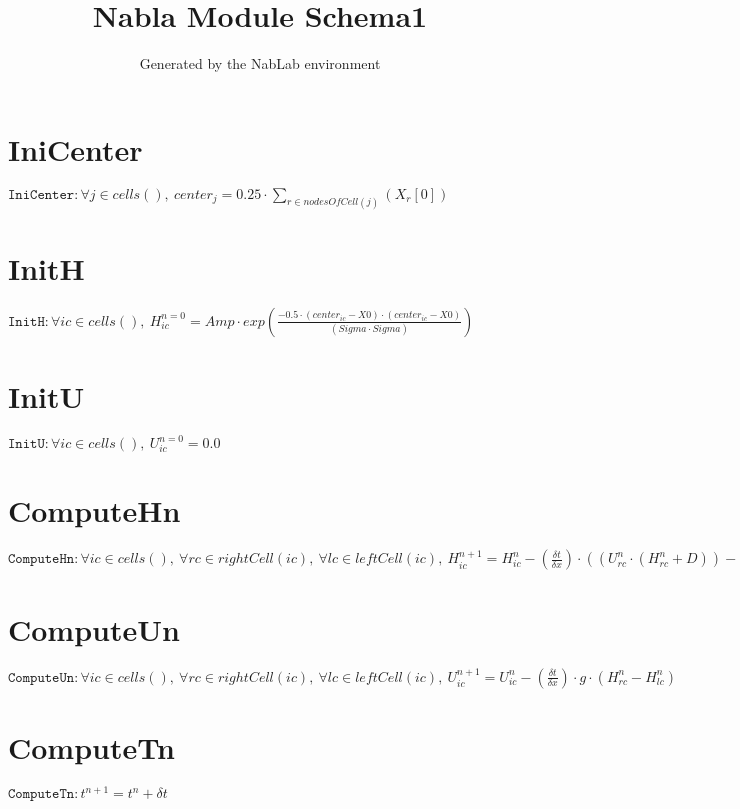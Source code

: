 \documentclass[11pt]{article}
\title{Nabla Module Schema1}
\author{Generated by the NabLab environment}
\begin{document}
\maketitle


\section{IniCenter}
$\texttt{IniCenter} : \forall{j\in cells()}, \ center_{j} = 0.25 \cdot \sum_{r\in nodesOfCell(j)}\left(X_{r}\left[0\right]\right)$


\section{InitH}
$\texttt{InitH} : \forall{ic\in cells()}, \ H^{n=0}_{ic} = Amp \cdot exp\left(\frac{-0.5 \cdot (center_{ic} - X0) \cdot (center_{ic} - X0)}{(Sigma \cdot Sigma)}\right)$


\section{InitU}
$\texttt{InitU} : \forall{ic\in cells()}, \ U^{n=0}_{ic} = 0.0$


\section{ComputeHn}
$\texttt{ComputeHn} : \forall{ic\in cells()}, \ \forall{rc\in rightCell(ic)}, \ \forall{lc\in leftCell(ic)}, \ H^{n+1}_{ic} = H^{n}_{ic} - (\frac{\delta t}{\delta x}) \cdot ((U^{n}_{rc} \cdot (H^{n}_{rc} + D)) - (U^{n}_{lc} \cdot (H^{n}_{lc} + D)))$


\section{ComputeUn}
$\texttt{ComputeUn} : \forall{ic\in cells()}, \ \forall{rc\in rightCell(ic)}, \ \forall{lc\in leftCell(ic)}, \ U^{n+1}_{ic} = U^{n}_{ic} - (\frac{\delta t}{\delta x}) \cdot g \cdot (H^{n}_{rc} - H^{n}_{lc})$


\section{ComputeTn}
$\texttt{ComputeTn} : t^{n+1} = t^{n} + \delta t$
\end{document}
